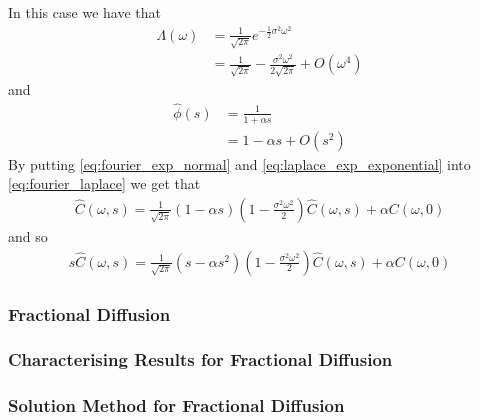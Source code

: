 In this case we have that
\begin{align}
    \Lambda(\omega) &= \frac{1}{\sqrt{2\pi}} e^{-\frac{1}{2}\sigma^2 \omega^2} \\
    \label{eq:fourier_exp_normal}
        &= \frac{1}{\sqrt{2\pi}} - \frac{\sigma^2 \omega^2}{2\sqrt{2 \pi}} + O(\omega^4)
\end{align}
and
\begin{align}
    \hat{\phi}(s) &= \frac{1}{1 + \alpha s} \\
    \label{eq:laplace_exp_exponential}
        &= 1 - \alpha s + O(s^2) 
\end{align}
By putting \eqref{eq:fourier_exp_normal} and \eqref{eq:laplace_exp_exponential} into \eqref{eq:fourier_laplace} we get that
\begin{align}
    \hat{C}(\omega,s) = \frac{1}{\sqrt{2\pi}}(1 - \alpha s)\left( 1 - \frac{\sigma^2 \omega^2}{2}\right)\hat{C}(\omega,s) + \alpha C(\omega, 0) 
\end{align}
and so
\begin{align}
    s\hat{C}(\omega,s) = \frac{1}{\sqrt{2\pi}}(s - \alpha s^2)\left( 1 - \frac{\sigma^2 \omega^2}{2}\right)\hat{C}(\omega,s) + \alpha C(\omega, 0) 
\end{align}
\subsubsection{Fractional Diffusion}
\subsubsection{Characterising Results for Fractional Diffusion}
\subsubsection{Solution Method for Fractional Diffusion}

\clearpage 
